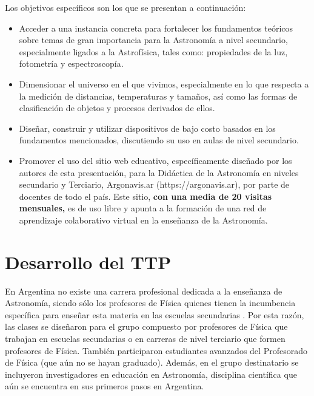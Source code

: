 \documentclass[baaa]{baaa}
\begin{document}
Los objetivos espec\'ificos son los que se presentan a continuaci\'on:
\begin{itemize}
\item Acceder a una instancia concreta para fortalecer los fundamentos te\'oricos sobre temas de gran importancia para la Astronom\'ia a nivel secundario, especialmente ligados a la Astrof\'isica, tales como: propiedades de la luz, fotometr\'ia y espectroscop\'ia.
\item Dimensionar el universo en el que vivimos, especialmente en lo que respecta a la medici\'on de distancias, temperaturas y tama\~nos, as\'i como las formas de clasificaci\'on de objetos y procesos derivados de ellos.
\item Dise\~nar, construir y utilizar dispositivos de bajo costo basados en los fundamentos mencionados, discutiendo su uso en aulas de nivel secundario.
\item Promover el uso del sitio web educativo, espec\'ificamente dise\~nado por los autores de esta presentaci\'on, para la Did\'actica de la Astronom\'ia en niveles secundario y Terciario, Argonavis.ar (https://argonavis.ar)\citep{Camino2023}, por parte de docentes de todo el pa\'is. Este sitio, {\bf con una media de 20 visitas mensuales,} es de uso libre y apunta a la formaci\'on de una red de aprendizaje colaborativo virtual en la ense\~nanza de la Astronom\'ia.
\end{itemize}

\section{Desarrollo del TTP}

En Argentina no existe una carrera profesional dedicada a la ense\~nanza de Astronom\'ia, siendo s\'olo los profesores de F\'isica quienes tienen la incumbencia espec\'ifica para ense\~nar esta materia en las escuelas secundarias \citep{Camino2021,Camino2022}. Por esta raz\'on, las clases se dise\~naron para el grupo compuesto por profesores de F\'isica que trabajan en escuelas secundarias o en carreras de nivel terciario que formen profesores de F\'isica. Tambi\'en participaron estudiantes avanzados del Profesorado de F\'isica (que a\'un no se hayan graduado). Adem\'as, en el grupo destinatario se incluyeron investigadores en educaci\'on en Astronom\'ia, disciplina cient\'ifica que a\'un se encuentra en sus primeros pasos en Argentina.
\end{document}
